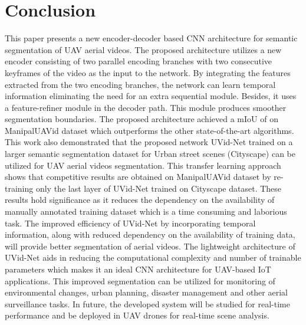 \documentclass[journal]{IEEEtran}
\begin{document}
\section{Conclusion}
\par This paper presents a new encoder-decoder based CNN architecture for semantic segmentation of UAV aerial videos. The proposed architecture utilizes a new encoder consisting of two parallel encoding branches with two consecutive keyframes of the video as the input to the network. By integrating the features extracted from the two encoding branches, the network can learn temporal information eliminating the need for an extra sequential module. Besides, it uses a feature-refiner module in the decoder path. This module produces smoother segmentation boundaries. The proposed architecture achieved a mIoU of  on ManipalUAVid dataset which outperforms the other state-of-the-art algorithms. 
This work also demonstrated that the proposed network UVid-Net trained on a larger semantic segmentation dataset for Urban street scenes (Cityscape) can be utilized for UAV aerial videos segmentation. This transfer learning approach shows that competitive results are obtained on ManipalUAVid dataset by re-training only the last layer of UVid-Net trained on Cityscape dataset.  These results hold significance as it reduces the dependency on the availability of manually annotated training dataset which is a time consuming and laborious task. 
The improved efficiency of UVid-Net by incorporating temporal information, along with reduced dependency on the availability of training data, will provide better segmentation of aerial videos. The lightweight architecture of UVid-Net aids in reducing the computational complexity and number of trainable parameters which makes it an ideal CNN architecture for UAV-based IoT applications. This improved segmentation can be utilized for monitoring of environmental changes, urban planning, disaster management and other aerial surveillance tasks.  In future, the developed system will be studied for real-time performance and be deployed in UAV drones for real-time scene analysis. 
\end{document}
